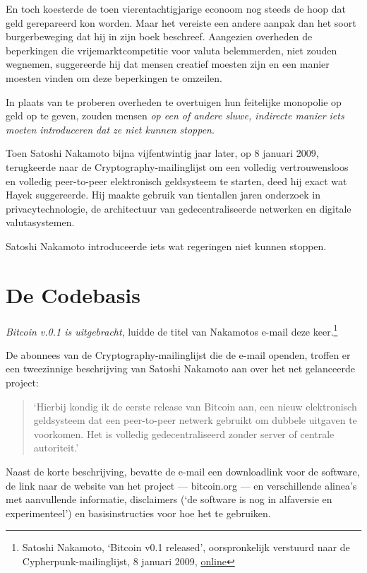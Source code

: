 \documentclass[smalldemyvopaper,11pt,twoside,onecolumn,openright,extrafontsizes,hidelinks]{memoir}
\begin{document}
En toch koesterde de toen vierentachtigjarige econoom nog steeds de hoop
dat geld gerepareerd kon worden. Maar het vereiste een andere aanpak dan
het soort burgerbeweging dat hij in zijn boek beschreef. Aangezien
overheden de beperkingen die vrijemarktcompetitie voor valuta
belemmerden, niet zouden wegnemen, suggereerde hij dat mensen creatief
moesten zijn en een manier moesten vinden om deze beperkingen te
omzeilen.

In plaats van te proberen overheden te overtuigen hun feitelijke
monopolie op geld op te geven, zouden mensen \emph{op een of andere
sluwe, indirecte manier iets moeten introduceren dat ze niet kunnen
stoppen}.

Toen Satoshi Nakamoto bijna vijfentwintig jaar later, op 8 januari 2009,
terugkeerde naar de Cryptography-mailinglijst om een volledig
vertrouwensloos en volledig peer-to-peer elektronisch geldsysteem te
starten, deed hij exact wat Hayek suggereerde. Hij maakte gebruik van
tientallen jaren onderzoek in privacytechnologie, de architectuur van
gedecentraliseerde netwerken en digitale valutasystemen.

Satoshi Nakamoto introduceerde iets wat regeringen niet kunnen stoppen.

\section{De Codebasis}\label{de-codebasis}

\emph{Bitcoin v.0.1 is uitgebracht}, luidde de titel van Nakamotos
e-mail deze keer.\footnote{Satoshi Nakamoto, `Bitcoin v0.1 released',
  oorspronkelijk verstuurd naar de Cypherpunk-mailinglijst, 8 januari
  2009,
  \href{https://www.mail-archive.com/cryptography@metzdowd.com/msg10142.html}{online}}

De abonnees van de Cryptography-mailinglijst die de e-mail openden,
troffen er een tweezinnige beschrijving van Satoshi Nakamoto aan over
het net gelanceerde project:

\begin{quote}
`Hierbij kondig ik de eerste release van Bitcoin aan, een nieuw
elektronisch geldsysteem dat een peer-to-peer netwerk gebruikt om
dubbele uitgaven te voorkomen. Het is volledig gedecentraliseerd zonder
server of centrale autoriteit.'
\end{quote}

Naast de korte beschrijving, bevatte de e-mail een downloadlink voor de
software, de link naar de website van het project --- bitcoin.org --- en
verschillende alinea's met aanvullende informatie, disclaimers (`de
software is nog in alfaversie en experimenteel') en basisinstructies
voor hoe het te gebruiken.
\end{document}
